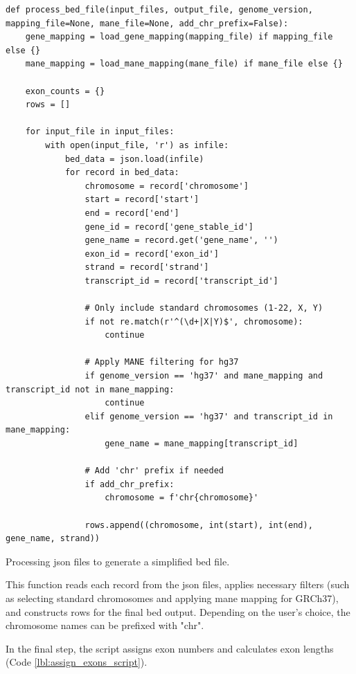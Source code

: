 \begin{longlisting}
\begin{verbatim}
def process_bed_file(input_files, output_file, genome_version, mapping_file=None, mane_file=None, add_chr_prefix=False):
    gene_mapping = load_gene_mapping(mapping_file) if mapping_file else {}
    mane_mapping = load_mane_mapping(mane_file) if mane_file else {}

    exon_counts = {}
    rows = []

    for input_file in input_files:
        with open(input_file, 'r') as infile:
            bed_data = json.load(infile)
            for record in bed_data:
                chromosome = record['chromosome']
                start = record['start']
                end = record['end']
                gene_id = record['gene_stable_id']
                gene_name = record.get('gene_name', '')
                exon_id = record['exon_id']
                strand = record['strand']
                transcript_id = record['transcript_id']

                # Only include standard chromosomes (1-22, X, Y)
                if not re.match(r'^(\d+|X|Y)$', chromosome):
                    continue

                # Apply MANE filtering for hg37
                if genome_version == 'hg37' and mane_mapping and transcript_id not in mane_mapping:
                    continue
                elif genome_version == 'hg37' and transcript_id in mane_mapping:
                    gene_name = mane_mapping[transcript_id]

                # Add 'chr' prefix if needed
                if add_chr_prefix:
                    chromosome = f'chr{chromosome}'

                rows.append((chromosome, int(start), int(end), gene_name, strand))
\end{verbatim}
\caption{Processing \ac{json} files to generate a simplified \ac{bed} file.}
\label{lbl:process_bed_script}
\end{longlisting}

This function reads each record from the \ac{json} files, applies necessary filters (such as selecting standard chromosomes and applying \ac{mane} mapping for GRCh37), and constructs rows for the final \ac{bed} output. Depending on the user's choice, the chromosome names can be prefixed with "chr".

In the final step, the script assigns exon numbers and calculates exon lengths (Code \ref{lbl:assign_exons_script}).

